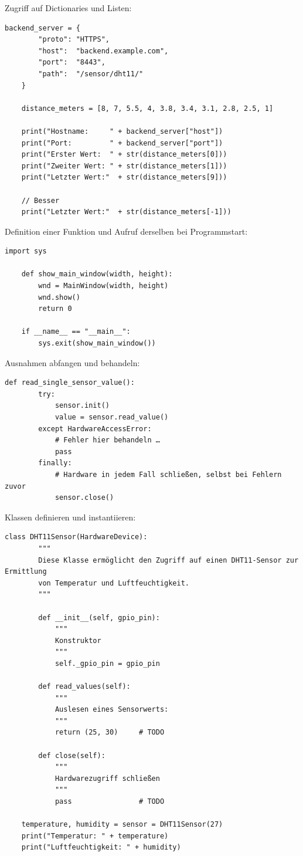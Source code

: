 \teilaufgabe
Zugriff auf Dictionaries und Listen:

\begin{Verbatim}[gobble=4]
    backend_server = {
        "proto": "HTTPS",
        "host":  "backend.example.com",
        "port":  "8443",
        "path":  "/sensor/dht11/"
    }

    distance_meters = [8, 7, 5.5, 4, 3.8, 3.4, 3.1, 2.8, 2.5, 1]

    print("Hostname:     " + backend_server["host"])
    print("Port:         " + backend_server["port"])
    print("Erster Wert:  " + str(distance_meters[0]))
    print("Zweiter Wert: " + str(distance_meters[1]))
    print("Letzter Wert:"  + str(distance_meters[9]))

    // Besser
    print("Letzter Wert:"  + str(distance_meters[-1]))
\end{Verbatim}

\bigskip
\teilaufgabe
Definition einer Funktion und Aufruf derselben bei Programmstart:

\begin{Verbatim}[gobble=4]
    import sys

    def show_main_window(width, height):
        wnd = MainWindow(width, height)
        wnd.show()
        return 0

    if __name__ == "__main__":
        sys.exit(show_main_window())
\end{Verbatim}

\teilaufgabe
Ausnahmen abfangen und behandeln:

\begin{Verbatim}[gobble=4]
    def read_single_sensor_value():
        try:
            sensor.init()
            value = sensor.read_value()
        except HardwareAccessError:
            # Fehler hier behandeln …
            pass
        finally:
            # Hardware in jedem Fall schließen, selbst bei Fehlern zuvor
            sensor.close()
\end{Verbatim}

\teilaufgabe
Klassen definieren und instantiieren:

\begin{Verbatim}[gobble=4]
    class DHT11Sensor(HardwareDevice):
        """
        Diese Klasse ermöglicht den Zugriff auf einen DHT11-Sensor zur Ermittlung
        von Temperatur und Luftfeuchtigkeit.
        """

        def __init__(self, gpio_pin):
            """
            Konstruktor
            """
            self._gpio_pin = gpio_pin

        def read_values(self):
            """
            Auslesen eines Sensorwerts:
            """
            return (25, 30)     # TODO

        def close(self):
            """
            Hardwarezugriff schließen
            """
            pass                # TODO

    temperature, humidity = sensor = DHT11Sensor(27)
    print("Temperatur: " + temperature)
    print("Luftfeuchtigkeit: " + humidity)
\end{Verbatim}

